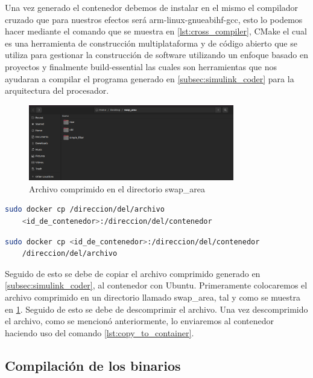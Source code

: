 Una vez generado el contenedor debemos de instalar en el mismo el compilador cruzado que para nuestros efectos será arm-linux-gnueabihf-gcc, esto lo podemos hacer mediante el comando que se muestra en \ref{lst:cross_compiler},  CMake el cual es una herramienta de construcción multiplataforma y de código abierto que se utiliza para gestionar la construcción de software utilizando un enfoque basado en proyectos y finalmente build-essential las cuales son herramientas que nos ayudaran a compilar el programa generado en \ref{subsec:simulink_coder} para la arquitectura del procesador.

\begin{figure}[h!]
    \centering
    \includegraphics[width=0.8\textwidth]{fig/especifico_2/paso_a_paso_mtmt/root_folder.png}
    \caption{Archivo comprimido en el directorio swap\_area}
    \label{fig:pestana_swap_area}
\end{figure}

\begin{lstlisting}[language=bash, caption={Copiar archivos al contenedor, Linux}, label=lst:copy_to_container]
    sudo docker cp /direccion/del/archivo 
    <id_de_contenedor>:/direccion/del/contenedor
\end{lstlisting}

\begin{lstlisting}[language=bash, caption={Copiar archivos del contenedor, Linux}, label=lst:copy_from_container]
    sudo docker cp <id_de_contenedor>:/direccion/del/contenedor
    /direccion/del/archivo
\end{lstlisting}

Seguido de esto se debe de copiar el archivo comprimido generado en \ref{subsec:simulink_coder}, al contenedor con Ubuntu. Primeramente colocaremos el archivo comprimido en un directorio llamado swap\_area, tal y como se muestra en \ref{fig:pestana_swap_area}. Seguido de esto se debe de descomprimir el archivo. Una vez descomprimido el archivo, como se mencionó anteriormente, lo enviaremos al contenedor haciendo uso del comando \ref{lst:copy_to_container}.

\subsection{Compilación de los binarios}\label{subsec:compilacion_binario}

